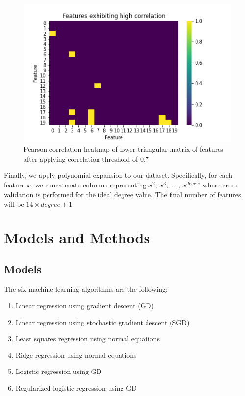 \documentclass[10pt,conference,compsocconf]{IEEEtran}
\begin{document}


\begin{figure}
  \centering\includegraphics[width=0.8\linewidth]{high_corr_features.png}
  \caption{Pearson correlation heatmap of lower triangular matrix of features after applying correlation threshold of 0.7}
  \label{fig:corr}
\end{figure}

Finally, we apply polynomial expansion to our dataset. Specifically, for each feature $x$, we concatenate columns representing $x^2$, $x^3$, ... , $x^{degree}$ where cross validation is performed for the ideal degree value. The final number of features will be $14 \times degree + 1$.


\section{Models and Methods}
\label{sec:methods}

\subsection{Models}

The six machine learning algorithms are the following:
\begin{enumerate}
  \item Linear regression using gradient descent (GD)
  \item Linear regression using stochastic gradient descent (SGD)
  \item Least squares regression using normal equations
  \item Ridge regression using normal equations
  \item Logistic regression using GD
  \item Regularized logistic regression using GD
\end{enumerate}
\end{document}

